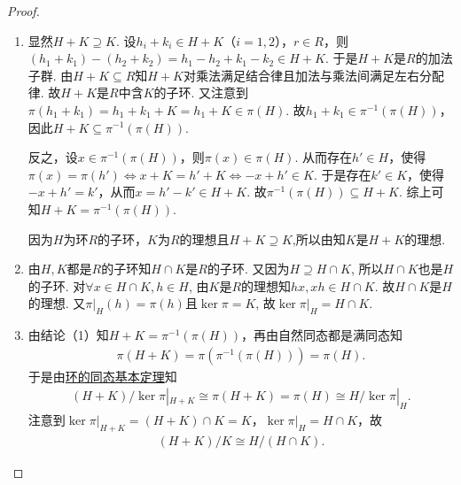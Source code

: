 \documentclass[../../main.tex]{subfiles}%
\begin{document}
\begin{proof}
\begin{enumerate}[(1)]
\item 显然$H+K \supseteq K$. 设$h_i + k_i \in H+K$（$i=1,2$），$r \in R$，则$(h_1 + k_1) - (h_2 + k_2) = h_1 - h_2 + k_1 - k_2 \in H+K$.
于是$H+K$是$R$的加法子群. 由$H+K \subseteq R$知$H+K$对乘法满足结合律且加法与乘法间满足左右分配律. 故$H+K$是$R$中含$K$的子环. 又注意到
$\pi(h_1 + k_1) = h_1 + k_1 + K = h_1 + K \in \pi(H)$.
故$h_1 + k_1 \in \pi^{-1}(\pi(H))$，因此$H+K \subseteq \pi^{-1}(\pi(H))$.

反之，设$x \in \pi^{-1}(\pi(H))$，则$\pi(x) \in \pi(H)$. 从而存在$h' \in H$，使得
$\pi(x) = \pi(h') \Longleftrightarrow x + K = h' + K \Longleftrightarrow -x + h' \in K$.
于是存在$k' \in K$，使得$-x + h' = k'$，从而$x = h' - k' \in H+K$. 故$\pi^{-1}(\pi(H)) \subseteq H+K$. 综上可知$H+K = \pi^{-1}(\pi(H))$.

因为$H$为环$R$的子环，$K$为$R$的理想且$H+K\supseteq K$,所以由知$K$是$H+K$的理想.

\item 由$H,K$都是$R$的子环知$H\cap K$是$R$的子环. 又因为$H\supseteq H\cap K$, 所以$H\cap K$也是$H$的子环. 对$\forall x\in H\cap K,h\in H$, 由$K$是$R$的理想知$hx,xh\in H\cap K$. 故$H\cap K$是$H$的理想.
又$\pi|_H(h) = \pi(h)$且$\ker\pi = K$, 故$\ker\pi|_H = H\cap K.$

\item 由结论（1）知$H+K=\pi^{-1}(\pi(H))$，再由自然同态都是满同态知
\begin{align*}
\pi(H+K) = \pi(\pi^{-1}(\pi(H))) = \pi(H).
\end{align*}
于是由\hyperref[theorem:环的同态基本定理]{环的同态基本定理}知
\begin{align*}
(H+K)/\ker\pi|_{H+K} \cong \pi(H+K) = \pi(H) \cong H/\ker\pi|_H.
\end{align*}
注意到$\ker\pi|_{H+K} = (H+K)\cap K = K$，$\ker\pi|_H = H\cap K$，故
\begin{align*}
(H+K)/K \cong H/(H\cap K).
\end{align*}
\end{enumerate}

\end{proof}
\end{document}

